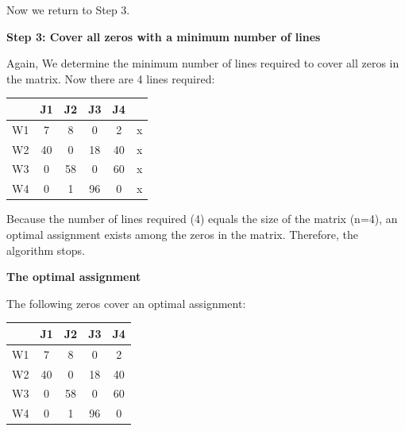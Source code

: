 \documentclass{llncs}
\begin{document}
Now we return to Step 3.

\textbf{Step 3: Cover all zeros with a minimum number of lines}

Again, We determine the minimum number of lines required to cover all zeros in the matrix. Now there are 4 lines required:
\begin{table}[H]
  \centering
    \begin{tabular}{cccccc}
    \toprule
          & J1    & J2    & J3    & J4    &  \\
    \midrule
    \phantom{2333} W1 \phantom{2333}   & \cellcolor[rgb]{ 0,  .69,  .941}\phantom{2333} 7 \phantom{2333} & \cellcolor[rgb]{ 0,  .69,  .941}\phantom{2333} 8 \phantom{2333} & \cellcolor[rgb]{ 0,  .69,  .941}\phantom{2333} 0 \phantom{2333} & \cellcolor[rgb]{ 0,  .69,  .941}\phantom{2333} 2 \phantom{2333} & \phantom{2333} x \phantom{2333} \\
    W2    & \cellcolor[rgb]{ 0,  .69,  .941}40 & \cellcolor[rgb]{ 0,  .69,  .941}0 & \cellcolor[rgb]{ 0,  .69,  .941}18 & \cellcolor[rgb]{ 0,  .69,  .941}40 & x \\
    W3    & \cellcolor[rgb]{ 0,  .69,  .941}0 & \cellcolor[rgb]{ 0,  .69,  .941}58 & \cellcolor[rgb]{ 0,  .69,  .941}0 & \cellcolor[rgb]{ 0,  .69,  .941}60 & x \\
    W4    & \cellcolor[rgb]{ 0,  .69,  .941}0 & \cellcolor[rgb]{ 0,  .69,  .941}1 & \cellcolor[rgb]{ 0,  .69,  .941}96 & \cellcolor[rgb]{ 0,  .69,  .941}0 & x \\
    \bottomrule
    \end{tabular}%
\end{table}%

Because the number of lines required (4) equals the size of the matrix (n=4), an optimal assignment exists among the zeros in the matrix. Therefore, the algorithm stops.

\textbf{The optimal assignment}

The following zeros cover an optimal assignment:
\begin{table}[H]
  \centering
    \begin{tabular}{ccccc}
    \toprule
          & J1    & J2    & J3    & J4 \\
    \midrule
    \phantom{2333} W1 \phantom{2333}   & \phantom{2333} 7 \phantom{2333}    & \phantom{2333} 8 \phantom{2333}    & \cellcolor[rgb]{ 0,  .69,  .941}\phantom{2333} 0 \phantom{2333} & \phantom{2333} 2 \phantom{2333} \\
    W2    & 40    & \cellcolor[rgb]{ 0,  .69,  .941}0 & 18    & 40 \\
    W3    & \cellcolor[rgb]{ 0,  .69,  .941}0 & 58    & 0     & 60 \\
    W4    & 0     & 1     & 96    & \cellcolor[rgb]{ 0,  .69,  .941}0 \\
    \bottomrule
    \end{tabular}%
\end{table}%
\end{document}
